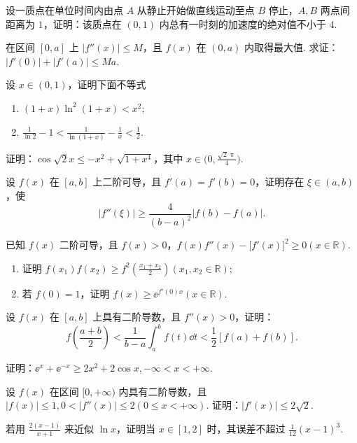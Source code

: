 	\begin{ti}
		设一质点在单位时间内由点 $A$ 从静止开始做直线运动至点 $B$ 停止，$A,B$ 两点间距离为 $1$，证明：该质点在 $(0,1)$ 内总有一时刻的加速度的绝对值不小于 $4$.
	\end{ti}

	\begin{ti}
		在区间 $[0,a]$ 上 $\left| f''(x) \right| \leq M$，且 $f(x)$ 在 $(0,a)$ 内取得最大值. 求证：$\left| f'(0) \right| + \left| f'(a) \right| \leq Ma$.
	\end{ti}

	\begin{ti}
		设 $x \in (0,1)$，证明下面不等式
		\begin{enumerate}
			\item $(1 + x) \ln^{2}(1 + x) < x^{2}$;
			\item $\frac{1}{\ln 2} - 1 < \frac{1}{\ln(1 + x)} - \frac{1}{x} < \frac{1}{2}$.
		\end{enumerate}
	\end{ti}

	\begin{ti}
		证明：$\cos \sqrt{2} x \leq - x^{2} + \sqrt{1 + x^{4}}$，其中 $x \in \bigl( 0, \frac{\sqrt{2}\uppi}{4} \bigr)$.
	\end{ti}

	\begin{ti}
		设 $f(x)$ 在 $[a,b]$ 上二阶可导，且 $f'(a) = f'(b) = 0$，证明存在 $\xi \in (a,b)$，使
		\[
			\left| f''(\xi) \right| \geq \frac{4}{(b - a)^{2}} \left| f(b) - f(a) \right|.
		\]
	\end{ti}

	\begin{ti}
		已知 $f(x)$ 二阶可导，且 $f(x) > 0$，$f(x) f''(x) - \bigl[ f'(x) \bigr]^{2} \geq 0 (x \in \mathbb{R})$.
		\begin{enumerate}
			\item 证明 $f(x_{1}) f(x_{2}) \geq f^{2}\left( \frac{x_{1} + x_{2}}{2} \right)(x_{1}, x_{2} \in \mathbb{R})$;
			\item 若 $f(0) = 1$，证明 $f(x) \geq \ee^{f'(0) x} (x \in \mathbb{R})$.
		\end{enumerate}
	\end{ti}

	\begin{ti}
		设 $f(x)$ 在 $[a,b]$ 上具有二阶导数，且 $f''(x) > 0$，证明：
		\[
			f\left( \frac{a + b}{2} \right) < \frac{1}{b - a} \int_{a}^{b} f(t) \dd{t} < \frac{1}{2} \left[ f(a) + f(b) \right].
		\]
	\end{ti}

	\begin{ti}
		证明：$\ee^{x} + \ee^{-x} \geq 2x^{2} + 2 \cos x, -\infty < x < +\infty$.
	\end{ti}

	\begin{ti}
		设 $f(x)$ 在区间 $[0,+\infty)$ 内具有二阶导数，且 $\bigl|f(x)\bigr| \leq 1, 0 < \bigl| f''(x) \bigr| \leq 2 (0 \leq x < +\infty)$. 证明：$\bigl| f'(x) \bigr| \leq 2\sqrt{2}$.
	\end{ti}

	\begin{ti}
		若用 $\frac{2(x - 1)}{x + 1}$ 来近似 $\ln x$，证明当 $x \in [1,2]$ 时，其误差不超过 $\frac{1}{12} (x - 1)^{3}$.
	\end{ti}